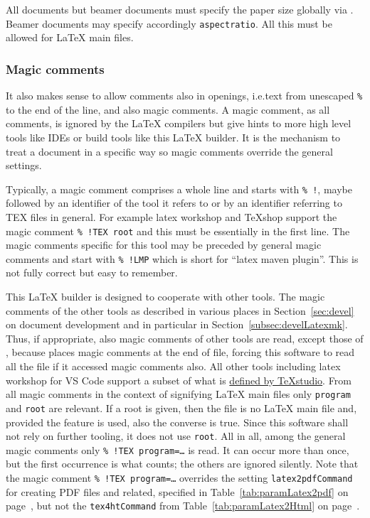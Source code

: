 All documents but beamer documents 
must specify the paper size globally via . 
Beamer documents may specify accordingly \texttt{aspectratio}. 
All this must be allowed for \LaTeX{} main files. 


\subsubsection{Magic comments}\label{subsubsec:openingMagComm}

It also makes sense to allow comments also in openings, 
i.e.\@ text from unescaped \texttt{\%} to the end of the line, 
and also magic comments. 
A magic comment, as all comments, is ignored by the \LaTeX{} compilers 
but give hints to more high level tools 
like IDEs or build tools like this \LaTeX{} builder. 
It is the mechanism to treat a document in a specific way 
so magic comments override the general settings. 

Typically, a magic comment comprises a whole line and starts with \texttt{\%~!}, 
maybe followed by an identifier of the tool it refers to 
or by an identifier referring to TEX files in general. 
For example latex workshop and \TeX{}shop support the magic comment \texttt{\%~!TEX root} 
and this must be essentially in the first line. 
The magic comments specific for this tool may be preceded by general magic comments 
and start with \texttt{\%~!LMP} which is short for ``latex maven plugin''. 
This is not fully correct but easy to remember. 

This \LaTeX{} builder is designed to cooperate with other tools. 
The magic comments of the other tools 
as described in various places in Section~\ref{sec:devel} 
on document development and in particular in Section~\ref{subsec:develLatexmk}. 
Thus, if appropriate, also magic comments of other tools are read, 
except those of \auctex, because \auctex{} places magic comments at the end of file, 
forcing this software to read all the file if it accessed \auctex{} magic comments also. 
All other tools including latex workshop for VS Code 
support a subset of what is 
\href{http://transit.iut2.upmf-grenoble.fr/doc/texstudio/html/usermanual_en.html#TEXCOM}%
{defined by \TeX{}studio}. 
From all magic comments in the context of signifying \LaTeX{} main files 
only \texttt{program} and \texttt{root} are relevant. 
If a root is given, then the file is no \LaTeX{} main file 
and, provided the feature is used, also the converse is true. 
Since this software shall not rely on further tooling, 
it does not use \texttt{root}. 
All in all, among the general magic comments only 
\texttt{\%~!TEX program=\dots} is read. 
It can occur more than once, but the first occurrence is what counts; 
the others are ignored silently. %
Note that the magic comment \texttt{\%~!TEX program=\dots} overrides 
the setting \texttt{latex2pdfCommand} for creating PDF files and related, 
specified in Table~\ref{tab:paramLatex2pdf} on page~\pageref{tab:paramLatex2pdf}, 
but not the \texttt{tex4htCommand} from Table~\ref{tab:paramLatex2Html} 
on page~\pageref{tab:paramLatex2Html}. 

